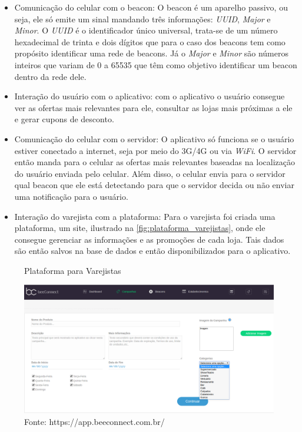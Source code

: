 \begin{itemize}
\item Comunicação do celular com o beacon: O beacon é um aparelho passivo, ou seja, ele só emite um sinal mandando três informações: \textit{UUID}, \textit{Major} e \textit{Minor}. O \textit{UUID} é o identificador único universal, trata-se de um número hexadecimal de trinta e dois dígitos que para o caso dos beacons tem como propósito identificar uma rede de beacons. Já o \textit{Major} e \textit{Minor} são números inteiros que variam de 0 a 65535 que têm como objetivo identificar um beacon dentro da rede dele.
\item Interação do usuário com o aplicativo: com o aplicativo o usuário consegue ver as ofertas mais relevantes para ele, consultar as lojas mais próximas a ele e gerar cupons de desconto.
\item Comunicação do celular com o servidor: O aplicativo só funciona se o usuário estiver conectado a internet, seja por meio do 3G/4G ou via \textit{WiFi}. O servidor então manda para o celular as ofertas mais relevantes baseadas na localização do usuário enviada pelo celular. Além disso, o celular envia para o servidor qual beacon que ele está detectando para que o servidor decida ou não enviar uma notificação para o usuário.
\item Interação do varejista com a plataforma: Para o varejista foi criada uma plataforma, um site, ilustrado na \autoref{fig:plataforma_varejistas}, onde ele consegue gerenciar as informações e as promoções de cada loja. Tais dados são então salvos na base de dados e então disponibilizados para o aplicativo.
\end{itemize}

\begin{figure}[H]
\caption{Plataforma para Varejistas}
\centerline{\includegraphics[scale=0.3]{img/plataforma_varejistas}}
\label{fig:plataforma_varejistas}
\caption* {Fonte: https://app.beeconnect.com.br/}
\end{figure}

